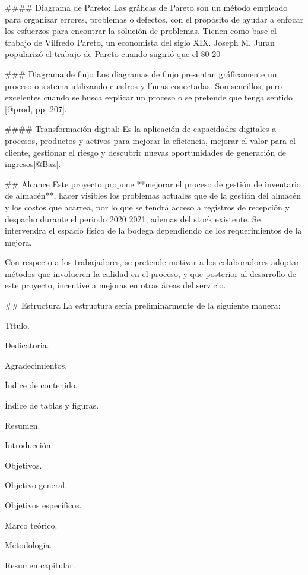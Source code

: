 \documentclass{article}\usepackage[]{graphicx}\usepackage[]{xcolor}
\begin{document}
#### Diagrama de Pareto:
Las gráficas de Pareto son un método empleado para organizar errores, problemas o defectos, con el
propósito de ayudar a enfocar los esfuerzos para encontrar la solución de problemas. Tienen como
base el trabajo de Vilfredo Pareto, un economista del siglo XIX. Joseph M. Juran popularizó el trabajo
de Pareto cuando sugirió que el 80%
20%

### Diagrama de flujo
Los diagramas de flujo presentan gráficamente un proceso o sistema utilizando cuadros y líneas
conectadas. Son sencillos, pero excelentes cuando se busca explicar un proceso o se
pretende que tenga sentido [@prod, pp. 207].

#### Transformación digital:
Es la aplicación de capacidades digitales a procesos, productos y activos para mejorar la eficiencia, mejorar el valor para el cliente, gestionar el riesgo y descubrir nuevas oportunidades de generación de ingresos[@Baz].

## Alcance
Este proyecto propone **mejorar el proceso de gestión de inventario de almacén**, hacer visibles los problemas actuales que de la gestión del almacén y los costos que acarrea, por lo que se tendrá acceso a registros de recepción y despacho durante el periodo 2020 2021, ademas del stock existente. Se intervendra el espacio físico de la bodega dependiendo de los requerimientos de la mejora.

Con respecto a los trabajadores, se pretende motivar a los colaboradores adoptar métodos que involucren la calidad en el proceso, y que posterior al desarrollo de este proyecto, incentive a mejoras en otras áreas del servicio.

## Estructura
La estructura sería preliminarmente de la siguiente manera:

Título.

Dedicatoria.

Agradecimientos.

Índice de contenido.

Índice de tablas y figuras.

Resumen.

Introducción.

Objetivos.

Objetivo general.

Objetivos específicos.

Marco teórico.

Metodología.

Resumen capitular.
\end{document}
